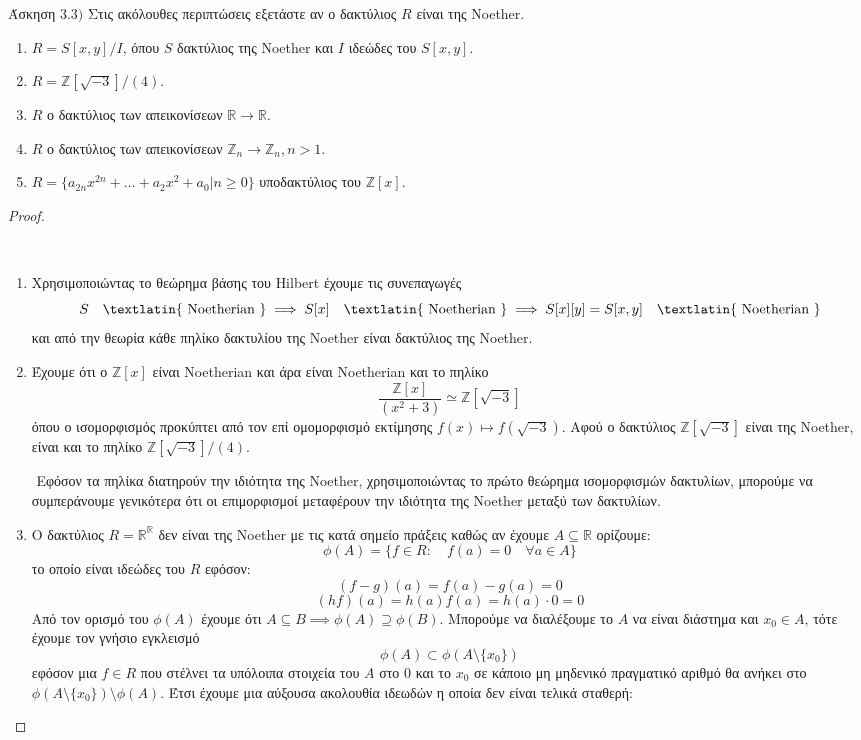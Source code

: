 \documentclass[oneside,a4paper]{article}
\newcommand {\tl}{\textlatin}
\newcommand{\Z}{\mathbb{Z}}
\begin{document}
\noindent Άσκηση $3.3)$
\quad Στις ακόλουθες περιπτώσεις εξετάστε αν ο δακτύλιος $R$ είναι της \tl{Noether}.
\begin{enumerate}
    \item $R = S[x,y]/I$, όπου $S$ δακτύλιος της \tl{Noether} και $I$ ιδεώδες του $S[x,y]$.
    \item $R = \Z[\sqrt{-3}]/(4)$.
    \item $R$ ο δακτύλιος των απεικονίσεων $\mathbb{R}\rightarrow \mathbb{R}$.
    \item $R$ ο δακτύλιος των απεικονίσεων $\Z_n \rightarrow \Z_n, n >1$.
    \item $R = \{a_{2n} x^{2n} + \ldots + a_2 x^2 + a_0 | n \geq 0\}$ υποδακτύλιος του $\Z[x]$.
\end{enumerate}
\begin{proof} $ $

	$ $\newline
	\begin{enumerate}
		\item Χρησιμοποιώντας το θεώρημα βάσης του \tl{Hilbert} έχουμε τις συνεπαγωγές
		$$S \quad \text{\tl{  Noetherian }} \implies S[x] \quad \text{\tl{  Noetherian }} \implies S[x][y] = S[x,y] \quad \text{\tl{  Noetherian }}$$
		και από την θεωρία κάθε πηλίκο δακτυλίου της \tl{Noether} είναι δακτύλιος της \tl{Noether}.

		\item Έχουμε ότι ο $\Z[x]$ είναι \tl{Noetherian} και άρα είναι \tl{Noetherian} και το πηλίκο
		$$\frac{\Z [x]}{(x^2+3)} \simeq \Z [\sqrt{-3}]$$
		όπου ο ισομορφισμός προκύπτει από τον επί ομομορφισμό εκτίμησης $f(x) \mapsto f(\sqrt{-3})$. Αφού ο δακτύλιος $\Z [\sqrt{-3}]$ είναι της \tl{Noether}, είναι και το πηλίκο $\Z[\sqrt{-3}]/(4)$. 
		
		$ $\newline
		Εφόσον τα πηλίκα διατηρούν την ιδιότητα της \tl{Noether}, χρησιμοποιώντας το πρώτο θεώρημα ισομορφισμών δακτυλίων, μπορούμε να συμπεράνουμε γενικότερα ότι οι επιμορφισμοί μεταφέρουν την ιδιότητα της \tl{Noether} μεταξύ των δακτυλίων.

		\item Ο δακτύλιος $R = \mathbb{R}^{\mathbb{R}}$ δεν είναι της \tl{Noether} με τις κατά σημείο πράξεις καθώς αν έχουμε $A\subseteq \mathbb{R}$ ορίζουμε:
		$$\phi(A) = \{f \in R: \quad f(a) = 0 \quad\forall a \in A\}$$
		το οποίο είναι ιδεώδες του $R$ εφόσον:
		$$(f-g)(a) = f(a)-g(a) = 0 $$
		$$(hf)(a) = h(a) f(a) = h(a) \cdot 0 = 0$$
		Από τον ορισμό του $\phi(A)$ έχουμε ότι $A\subseteq B \implies \phi(A) \supseteq \phi(B)$. Μπορούμε να διαλέξουμε το $A$ να είναι διάστημα και $x_0 \in A$, τότε έχουμε τον γνήσιο εγκλεισμό
		$$ \phi (A) \subset \phi(A \setminus \{x_0\})$$
		εφόσον μια $f \in R$ που στέλνει τα υπόλοιπα στοιχεία του $A$ στο $0$ και το $x_0$ σε κάποιο μη μηδενικό πραγματικό αριθμό θα ανήκει στο $\phi(A\setminus \{x_0\}) \setminus \phi(A)$. Έτσι έχουμε μια αύξουσα ακολουθία ιδεωδών η οποία δεν είναι τελικά σταθερή:


\end{enumerate}
\end{proof}
\end{document}
